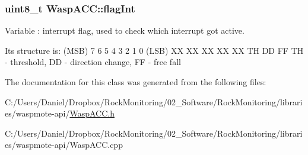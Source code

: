 \subsubsection[{\texorpdfstring{flag\+Int}{flagInt}}]{\setlength{\rightskip}{0pt plus 5cm}uint8\+\_\+t Wasp\+A\+C\+C\+::flag\+Int}\hypertarget{class_wasp_a_c_c_a6ce4e7806e8476ae6b71c93664676667}{}\label{class_wasp_a_c_c_a6ce4e7806e8476ae6b71c93664676667}


Variable \+: interrupt flag, used to check which interrupt got active. 

Its structure is\+: (M\+SB) 7 6 5 4 3 2 1 0 (L\+SB) XX XX XX XX XX TH DD FF TH -\/ threshold, DD -\/ direction change, FF -\/ free fall 

The documentation for this class was generated from the following files\+:\begin{DoxyCompactItemize}
\item 
C\+:/\+Users/\+Daniel/\+Dropbox/\+Rock\+Monitoring/02\+\_\+\+Software/\+Rock\+Monitoring/libraries/waspmote-\/api/\hyperlink{_wasp_a_c_c_8h}{Wasp\+A\+C\+C.\+h}\item 
C\+:/\+Users/\+Daniel/\+Dropbox/\+Rock\+Monitoring/02\+\_\+\+Software/\+Rock\+Monitoring/libraries/waspmote-\/api/Wasp\+A\+C\+C.\+cpp\end{DoxyCompactItemize}
